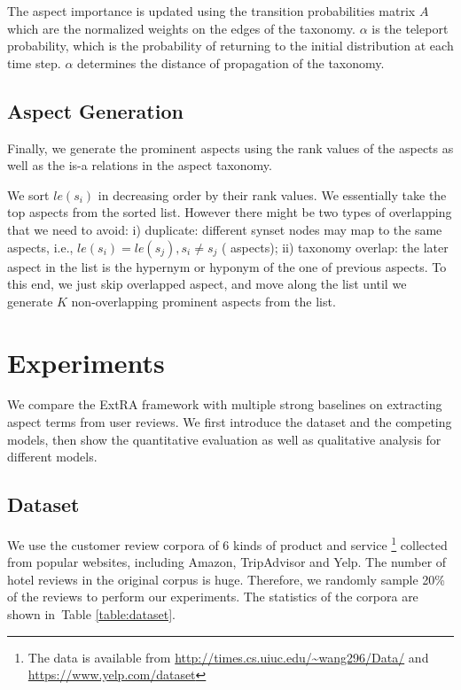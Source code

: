 \documentclass[11pt,a4paper]{article}
\newcommand{\tabref}[1]{Table \ref{#1}}
\begin{document}
The aspect importance is updated using the transition probabilities matrix 
$A$ which are the normalized weights on the edges of the taxonomy. 
$\alpha$ is the teleport probability, which is 
the probability of returning to the initial distribution
at each time step. 
$\alpha$ determines the distance of propagation of the taxonomy. 

\subsection{Aspect Generation}
\label{sec:generation}
Finally, we generate the prominent aspects 
using the rank values of the aspects as well as the is-a relations
in the aspect taxonomy.

We sort $le(s_i)$ in decreasing order by their rank values.
We essentially take the top aspects from the sorted list.
However there might be two types of overlapping that we need to
avoid:
i) duplicate: different synset nodes may map to the same aspects, 
i.e., $le(s_i) = le(s_j), s_i \neq s_j$ ( aspects);
ii) taxonomy overlap: the later aspect in the list is the 
hypernym or hyponym of the one of previous aspects.
To this end, we just skip overlapped aspect, and move along the list
until we generate $K$ non-overlapping prominent aspects from the list.

\section{Experiments}
\label{sec:experiments}
We compare the ExtRA framework with 
multiple strong baselines on extracting aspect terms from user reviews. 
We first introduce the dataset and the competing models, then
show the quantitative evaluation as well as qualitative analysis for
different models.

\subsection{Dataset}
\label{sec:dataset}
We use the customer review corpora of 6 kinds of product and service
\footnote{The data is available from
	\url{http://times.cs.uiuc.edu/~wang296/Data/} and 
	\url{https://www.yelp.com/dataset}} collected from popular websites, 
including Amazon, TripAdvisor and Yelp. 
The number of hotel reviews \cite{Wang2011LearningOD} in the original
corpus is huge. 
Therefore, we randomly sample 20\% of the reviews to perform our experiments.
The statistics of the corpora are shown in~\tabref{table:dataset}.
\end{document}
